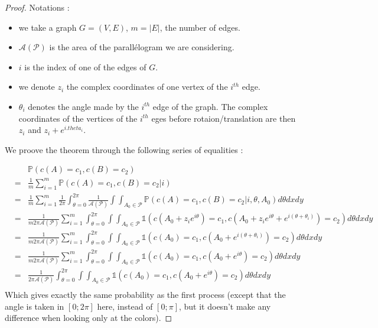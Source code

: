 \documentclass[a4paper,11pt]{article}
\begin{document}
\begin{proof}
Notations : \\
\begin{itemize}
\item we take a graph $G=(V,E)$, $m = |E|$, the number of edges.

\item $\mathcal{A(P)}$ is the area of the parallélogram we are considering.

\item $i$ is the index of one of the edges of $G$.

\item we denote $z_i$ the complex coordinates of one vertex of the $i^{th}$ edge.

\item $\theta_i$ denotes the angle made by the $i^{th}$ edge of the graph. The complex coordinates of the vertices of the $i^{th}$ eges before rotaion/translation are then $z_i $ and $z_i + e^{i.theta_i}$.

\end{itemize}


\vspace{1 cm}
We proove the theorem through the following series of equalities :

\begin{eqnarray*}
& & \mathbb{P}(c(A) = c_1, c(B) = c_2) \\
  &=& \frac{1}{m}\sum_{i=1}^{m} \mathbb{P}(c(A) = c_1, c(B) = c_2 | i)  \\
  &=& \frac{1}{m}\sum_{i=1}^{m}  \frac{1}{2\pi}\int_{\theta =0} ^{2\pi} \frac{1}{\mathcal{A(P)}}\int\int_{A_0 \in \mathcal{P}} \mathbb{P}(c(A) = c_1, c(B) = c_2 | i, \theta, A_0) d\theta dx dy \\  
  &=& \frac{1}{m 2\pi \mathcal{A(P)}}\sum_{i=1}^{m}\int_{\theta =0} ^{2\pi} \int\int_{A_0 \in \mathcal{P}} \mathds{1}(c(A_0 + z_i e^{i\theta}) = c_1, c(A_0 +z_i e^{i\theta} + e^{i (\theta + \theta_i)}) = c_2) d\theta dx dy \\  
    &=& \frac{1}{m 2\pi \mathcal{A(P)}}\sum_{i=1}^{m} \int_{\theta =0} ^{2\pi} \int\int_{A_0 \in \mathcal{P}} \mathds{1}(c(A_0) = c_1, c(A_0 + e^{i (\theta + \theta_i)}) = c_2 ) d\theta dx dy \\ 
    &=& \frac{1}{m 2\pi \mathcal{A(P)}}\sum_{i=1}^{m} \int_{\theta =0} ^{2\pi} \int\int_{A_0 \in \mathcal{P}} \mathds{1}(c(A_0) = c_1, c(A_0 + e^{i \theta}) = c_2 ) d\theta dx dy \\ 
    &=& \frac{1}{2\pi \mathcal{A(P)}}\int_{\theta =0} ^{2\pi} \int\int_{A_0 \in \mathcal{P}} \mathds{1}(c(A_0) = c_1, c(A_0 + e^{i \theta}) = c_2 ) d\theta dx dy \\ 
\end{eqnarray*}
Which gives exactly the same probability as the first process (except that the angle is taken in $[0;2\pi]$ here, instead of $[0;\pi]$, but it doesn't make any difference when looking only at the colors).
\end{proof}
\end{document}
